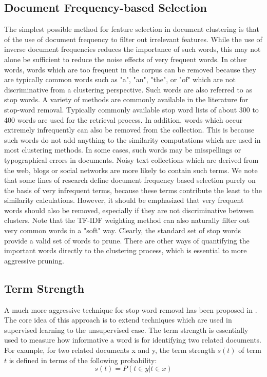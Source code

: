 \subsection{Document Frequency-based Selection}
The simplest possible method for feature selection in document clustering is that of the use of document frequency to filter out irrelevant features. While the use of inverse document frequencies reduces the importance of such words, this may not alone be sufficient to reduce the noise effects of very frequent words. In other words, words which are too frequent in the corpus can be removed because they are typically common words such as "a", "an", "the", or "of" which are not discriminative from a clustering perspective. Such words are also referred to as stop words. A variety of methods are commonly available in the literature for stop-word removal. Typically commonly available stop word lists of about 300 to 400 words are used for the retrieval process. In addition, words which occur extremely infrequently can also be removed from the collection. This is because such words do not add anything to the similarity computations which are used in most clustering methods. In some cases, such words may be misspellings or typographical errors in documents. Noisy text collections which are derived from the web, blogs or social networks are more likely to contain such terms. We note that some lines of research define document frequency based selection purely on the basis of very infrequent terms, because these terms contribute the least to the similarity calculations. However, it should be emphasized that very frequent words should also be removed, especially if they are not discriminative between clusters. Note that the TF-IDF weighting method can also naturally filter out very common words in a "soft" way. Clearly, the standard set of stop words provide a valid set of words to prune. There are other ways of quantifying the important words directly to the clustering process, which is essential to more aggressive pruning.

\subsection{Term Strength}
A much more aggressive technique for stop-word removal has been proposed in \cite{Wilbur1992}. The core idea of this approach
is to extend techniques which are used in supervised learning to the unsupervised case. The term strength is essentially used to measure how informative a word is for identifying two related documents. For example, for two related documents x and y, the term strength $s(t)$ of term $t$ is defined in terms of the following probability:
\[
    s(t) = P(t \in y | t \in x)
    \label{eq:probTermStrength} \tag{233}
\]

